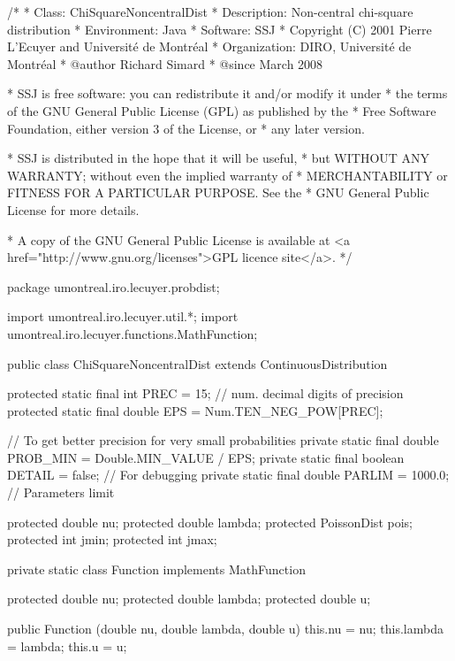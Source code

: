 \begin{code}\begin{hide}
/*
 * Class:        ChiSquareNoncentralDist
 * Description:  Non-central chi-square distribution
 * Environment:  Java
 * Software:     SSJ 
 * Copyright (C) 2001  Pierre L'Ecuyer and Université de Montréal
 * Organization: DIRO, Université de Montréal
 * @author       Richard Simard
 * @since        March 2008

 * SSJ is free software: you can redistribute it and/or modify it under
 * the terms of the GNU General Public License (GPL) as published by the
 * Free Software Foundation, either version 3 of the License, or
 * any later version.

 * SSJ is distributed in the hope that it will be useful,
 * but WITHOUT ANY WARRANTY; without even the implied warranty of
 * MERCHANTABILITY or FITNESS FOR A PARTICULAR PURPOSE.  See the
 * GNU General Public License for more details.

 * A copy of the GNU General Public License is available at
   <a href="http://www.gnu.org/licenses">GPL licence site</a>.
 */
\end{hide}
package umontreal.iro.lecuyer.probdist;
\begin{hide}
import umontreal.iro.lecuyer.util.*;
import umontreal.iro.lecuyer.functions.MathFunction;
\end{hide}

public class ChiSquareNoncentralDist extends ContinuousDistribution\begin{hide} {

   protected static final int PREC = 15;   // num. decimal digits of precision
   protected static final double EPS = Num.TEN_NEG_POW[PREC];

   // To get better precision for very small probabilities
   private static final double PROB_MIN = Double.MIN_VALUE / EPS;
   private static final boolean DETAIL = false;   // For debugging
   private static final double PARLIM = 1000.0;   // Parameters limit

   protected double nu;
   protected double lambda;
   protected PoissonDist pois;
   protected int jmin;
   protected int jmax;

   private static class Function implements MathFunction {
      protected double nu;
      protected double lambda;
      protected double u;

      public Function (double nu, double lambda, double u) {
         this.nu = nu;
         this.lambda = lambda;
         this.u = u;
      }

}}
\end{hide}
\end{code}
